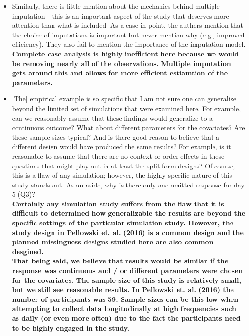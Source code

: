 \documentclass[letterpaper,12pt]{article}\usepackage[]{graphicx}\usepackage[]{color}
\begin{document}
\begin{itemize}
{\bf We believe that we have addressed this issue by re-writing and cleaning up large sections of the manuscript, which we believe now contain the appropriate level of detail.  }\\

\item Similarly, there is little mention about the mechanics behind multiple imputation - this is an important aspect of the study that deserves more attention than what is included. As a case in point, the authors mention that the choice of imputations is important but never mention why (e.g., improved efficiency). They also fail to mention the importance of the imputation model.\\

{\bf Complete case analysis is highly inefficient here because we would be removing nearly all of the observations.  Multiple imputation gets around this and allows for more efficient estiamtion of the parameters.}\\

\item {[The]} empirical example is so specific that I am not sure one can generalize beyond the limited set of simulations that were examined here.  For example, can we reasonably assume that these findings would generalize to a continuous outcome? What about different parameters for the covariates? Are these sample sizes typical? And is there good reason to believe that a different design would have produced the same results? For example, is it reasonable to assume that there are no context or order effects in these questions that might play out in at least the split form designs?  Of course, this is a flaw of any simulation; however, the highly specific nature of this study stands out. As an aside, why is there only one omitted response for day 5 (Q3)?\\

{\bf Certainly any simulation study suffers from the flaw that it is difficult to determined how generalizable the results are beyond the specific settings of the particular simulation study.  However, the study design in Pellowski et. al. (2016) is a common design and the planned missingness designs studied here are also common desgined.  \\

That being said, we believe that results would be similar if the response was continuous and / or different parameters were chosen for the covariates.  The sample size of this study is relatively small, but we still see reasonable results.  In Pellowski et. al. (2016) the number of participants was 59.  Sample sizes can be this low when attempting to collect data longitudinally at high frequencies such as daily (or even more often) due to the fact the participants need to be highly engaged in the study.\\


}
\end{itemize}
\end{document}
